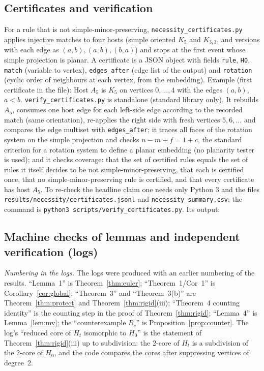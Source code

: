 \documentclass[10pt]{article}
\theoremstyle{definition}
\theoremstyle{plain}
\theoremstyle{remark}
\begin{document}
\subsection{Certificates and verification}
For a rule that is not simple-minor-preserving, \texttt{necessity\_certificates.py} applies injective matches to four hosts (simple oriented $K_5$ and $K_{3,3}$, and versions with each edge as $(a,b),(a,b),(b,a)$) and stops at the first event whose simple projection is planar. A certificate is a JSON object with fields \texttt{rule}, \texttt{H0}, \texttt{match} (variable to vertex), \texttt{edges\_after} (edge list of the output) and \texttt{rotation} (cyclic order of neighbours at each vertex, from the embedding). Example (first certificate in the file):
{}
\noindent Host $A_5$ is $K_5$ on vertices $0,\dots,4$ with the edges $(a,b)$, $a<b$. \texttt{verify\_certificates.py} is standalone (standard library only). It rebuilds $A_5$, consumes one host edge for each left-side edge according to the recorded match (same orientation), re-applies the right side with fresh vertices $5,6,\dots$ and compares the edge multiset with \texttt{edges\_after}; it traces all faces of the rotation system on the simple projection and checks $n-m+f=1+c$, the standard criterion for a rotation system to define a planar embedding (no planarity tester is used); and it checks coverage: that the set of certified rules equals the set of rules it itself decides to be not simple-minor-preserving, that each is certified once, that no simple-minor-preserving rule is certified, and that every certificate has host $A_5$. To re-check the headline claim one needs only Python 3 and the files \texttt{results/necessity/certificates.jsonl} and \texttt{necessity\_summary.csv}; the command is \texttt{python3 scripts/verify\_certificates.py}. Its output:
{}
\subsection{Machine checks of lemmas and independent verification (logs)}
\emph{Numbering in the logs.} The logs were produced with an earlier numbering of the results. ``Lemma~1'' is Theorem~\ref{thm:euler}; ``Theorem~1/Cor~1'' is Corollary~\ref{cor:global}; ``Theorem~3'' and ``Theorem~3(b)'' are Theorem~\ref{thm:protect} and Theorem~\ref{thm:rigid}(iii); ``Theorem~4 counting identity'' is the counting step in the proof of Theorem~\ref{thm:rigid}; ``Lemma~4'' is Lemma~\ref{lem:mv}; the ``counterexample $R_c$'' is Proposition~\ref{prop:counter}. The log's ``reduced core of $H_t$ isomorphic to $H_0$'' is the statement of Theorem~\ref{thm:rigid}(iii) up to subdivision: the 2-core of $H_t$ is a subdivision of the 2-core of $H_0$, and the code compares the cores after suppressing vertices of degree~2.
{}
{}
\end{document}
